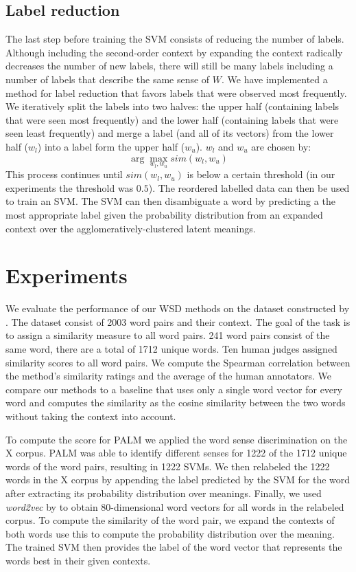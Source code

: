\documentclass[11pt]{article}
\begin{document}
\subsection{Label reduction}
The last step before training the SVM consists of reducing the number of labels. Although including the second-order context by expanding the context radically decreases the number of new labels, there will still be many labels including a number of labels that describe the same sense of $W$. We have implemented a method for label reduction that favors labels that were observed most frequently. We iteratively split the labels into two halves: the upper half (containing labels that were seen most frequently) and the lower half (containing labels that were seen least frequently) and merge a label (and all of its vectors) from the lower half ($w_l$) into a label form the upper half ($w_u$). $w_l$ and $w_u$ are chosen by: 
$$\arg\max_{w_l, w_u} \textit{sim}(w_l, w_u)$$
This process continues until $\textit{sim}(w_l, w_u)$ is below a certain threshold (in our experiments the threshold was $0.5$).
The reordered labelled data can then be used to train an SVM. The SVM can then disambiguate a word by predicting a the most appropriate label given the probability distribution from an expanded context over the agglomeratively-clustered latent meanings. 

\section{Experiments}
We evaluate the performance of our WSD methods on the dataset constructed by \cite{global}. The dataset consist of 2003 word pairs and their context. The goal of the task is to assign a similarity measure to all word pairs. 241 word pairs consist of the same word, there are a total of 1712 unique words. Ten human judges assigned similarity scores to all word pairs. We compute the Spearman correlation between the method's similarity ratings and the average of the human annotators. We compare our methods to a baseline that uses only a single word vector for every word and computes the similarity as the cosine similarity between the two words without taking the context into account. 

To compute the score for PALM we applied the word sense discrimination on the X corpus. PALM was able to identify different senses for 1222 of the 1712 unique words of the word pairs, resulting in 1222 SVMs. We then relabeled the 1222 words in the X corpus by appending the label predicted by the SVM for the word after extracting its probability distribution over meanings. Finally, we used \textit{word2vec} by \cite{word2vec} to obtain 80-dimensional word vectors for all words in the relabeled corpus. To compute the similarity of the word pair, we expand the contexts of both words use this to compute the probability distribution over the meaning. The trained SVM then provides the label of the word vector that represents the words best in their given contexts. 
\end{document}
